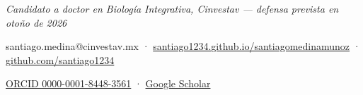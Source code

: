 \documentclass[11pt,letterpaper]{article}
\begin{document}
\thispagestyle{empty}

{\centering
  {\LARGE{}\par}
  \vspace{0.3em}
  {\itshape\color{Accent} Candidato a doctor en Biología Integrativa, Cinvestav --- defensa prevista en otoño de 2026\par}
  \vspace{0.2em}
  {\small santiago.medina@cinvestav.mx \;·\;
   \href{https://santiago1234.github.io/santiagomedinamunoz/}{santiago1234.github.io/santiagomedinamunoz} \;·\;
   \href{https://github.com/santiago1234}{github.com/santiago1234}\par
   \href{https://orcid.org/0000-0001-8448-3561}{ORCID 0000-0001-8448-3561} \;·\;
   \href{https://scholar.google.com/citations?user=XW3Sz1kAAAAJ&hl=es&oi=ao}{Google Scholar}\par}
  \vspace{0.3em}{\color{Accent}\rule{0.25\linewidth}{0.4pt}}\par}
\end{document}

